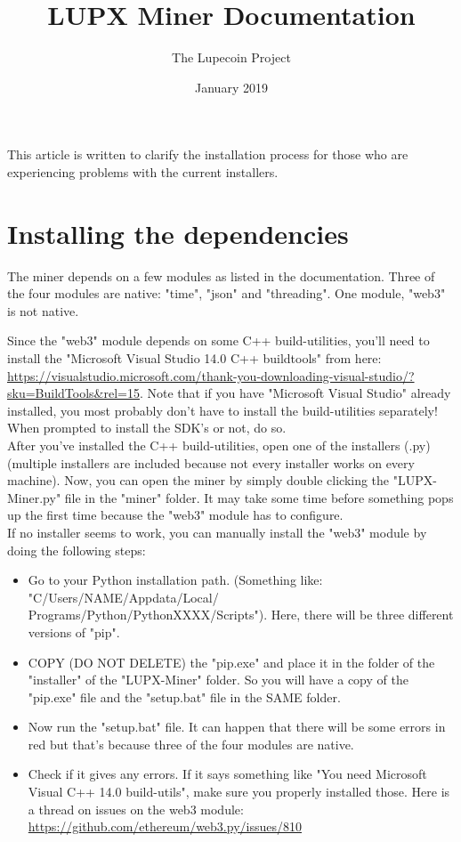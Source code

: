 \documentclass{article}
\title{LUPX Miner Documentation}
\author{The Lupecoin Project}
\date{January 2019}
\begin{document}
\maketitle

This article is written to clarify the installation process for those who are experiencing problems with the current installers.

\section{Installing the dependencies}
The miner depends on a few modules as listed in the documentation. Three of the four modules are native: "time", "json" and "threading". One module, "web3" is not native.

Since the "web3" module depends on some C++ build-utilities, you'll need to install the "Microsoft Visual Studio 14.0 C++ buildtools" from here: \\ \url{https://visualstudio.microsoft.com/thank-you-downloading-visual-studio/?sku=BuildTools&rel=15}. Note that if you have "Microsoft Visual Studio" already installed, you most probably don't have to install the build-utilities separately! When prompted to install the SDK's or not, do so. \\ 
After you've installed the C++ build-utilities, open one of the installers (.py) (multiple installers are included because not every installer works on every machine). Now, you can open the miner by simply double clicking the "LUPX-Miner.py" file in the "miner" folder. It may take some time before something pops up the first time because the "web3" module has to configure. \\
If no installer seems to work, you can manually install the "web3" module by doing the following steps:
\begin{itemize}
    \item Go to your Python installation path. (Something like: "C/Users/NAME/Appdata/Local/ Programs/Python/PythonXXXX/Scripts"). Here, there will be three different versions of "pip". 
    \item COPY (DO NOT DELETE) the "pip.exe" and place it in the folder of the "installer" of the "LUPX-Miner" folder. So you will have a copy of the "pip.exe" file and the "setup.bat" file in the SAME folder.
    \item Now run the "setup.bat" file. It can happen that there will be some errors in red but that's because three of the four modules are native.
    \item Check if it gives any errors. If it says something like "You need Microsoft Visual C++ 14.0 build-utils", make sure you properly installed those. Here is a thread on issues on the web3 module: \url{https://github.com/ethereum/web3.py/issues/810}
\end{itemize}
\end{document}
